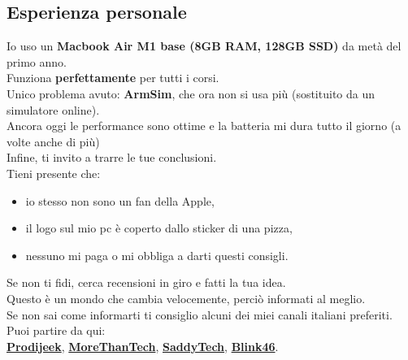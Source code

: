 \documentclass[18pt]{extarticle}
\begin{document}
\subsection{Esperienza personale}
Io uso un \textbf{Macbook Air M1 base (8GB RAM, 128GB SSD)} da metà del primo anno.\\
Funziona \textbf{perfettamente} per tutti i corsi.\\
Unico problema avuto: \textbf{ArmSim}, che ora non si usa più (sostituito da un simulatore online).\\
Ancora oggi le performance sono ottime e la batteria mi dura tutto il giorno (a volte anche di più)\\
Infine, ti invito a trarre le tue conclusioni.\\
Tieni presente che:
\begin{itemize}
\item io stesso non sono un fan della Apple,
\item il logo sul mio pc è coperto dallo sticker di una pizza,
\item nessuno mi paga o mi obbliga a darti questi consigli.
\end{itemize}%
Se non ti fidi, cerca recensioni in giro e fatti la tua idea.\\
Questo è un mondo che cambia velocemente, perciò informati al meglio.\\
Se non sai come informarti ti consiglio alcuni dei miei canali italiani preferiti. Puoi partire da qui:\\
\href{https://www.youtube.com/@Prodigeek}{\textbf{Prodijeek}}, \href{https://www.youtube.com/@MoreThanTech}{\textbf{MoreThanTech}}, \href{https://www.youtube.com/@SaddyTech}{\textbf{SaddyTech}}, \href{https://www.youtube.com/@Blink46yt}{\textbf{Blink46}}.

\clearpage
\end{document}
